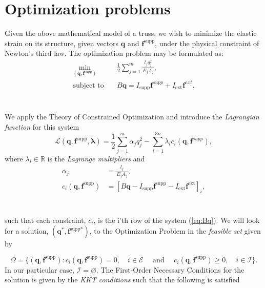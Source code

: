 \documentclass[10pt,a4paper]{article}
\begin{document}
\section{Optimization problems}
Given the above mathematical model of a truss, we wish to minimize the elastic strain on its structure, given vectors $\boldsymbol{q}$ and $\boldsymbol{f}^{\text{supp}}$, under the physical constraint of Newton's third law. The optimization problem may be formulated as:
\begin{align}
\min\limits_{(\boldsymbol{q},\boldsymbol{f}^{\text{supp}})}\quad&\frac{1}{2}\sum_{j=1}^m \frac{l_j q_j^2}{E_j A_j} ,\label{eq:min g}\\
\text{subject to} \quad &B\boldsymbol{q} = I_\text{supp}\boldsymbol{f}^{supp}+I_\text{ext}\boldsymbol{f}^{ext}.\label{eq:Bq}
\end{align}
\\\\
We apply the Theory of Constrained Optimization and introduce the \textit{Lagrangian function} for this system
\begin{equation*}
\mathcal{L}\left(\boldsymbol{q},\boldsymbol{f}^{\text{supp}},\boldsymbol{\lambda}\right) = \frac{1}{2}\sum_{j=1}^m \alpha_j q_{j}^2 - \sum_{i=1}^{3n}\lambda_i c_i\left(\boldsymbol{q},\boldsymbol{f}^{supp}\right),
\end{equation*}
where $\lambda_i \in \mathbb{R}$ is the \textit{Lagrange multipliers} and 
\begin{align*}
\alpha_j &= \frac{l_j}{E_j A_j}, \\
c_i\left(\boldsymbol{q},\boldsymbol{f}^\text{supp}\right) &= \left[ B\boldsymbol{q} - I_\text{supp}\boldsymbol{f}^\text{supp}-I_\text{ext}\boldsymbol{f}^\text{ext} \right]_i ,
\end{align*}
\\\\
such that each constraint, $c_i$, is the i'th row of the system (\ref{eq:Bq}). We will look for a solution, $\left(\boldsymbol{q}^*,\boldsymbol{f}^\text{supp*}\right)$, to the Optimization Problem in the \textit{feasible set} given by 

\begin{equation*}
\Omega = \lbrace \left(\boldsymbol{q},\boldsymbol{f}^\text{supp}\right) : c_i\left(\boldsymbol{q},\boldsymbol{f}^\text{supp}\right) = 0, \quad i \in \mathcal{E} \quad\text{ and }\quad c_i\left(\boldsymbol{q},\boldsymbol{f}^\text{supp}\right) \geq 0, \quad i \in \mathcal{I} \rbrace .
\end{equation*}
In our particular case, $\mathcal{I}=\varnothing$. The First-Order Necessary Conditions for the solution is given by the \textit{KKT conditions} such that the following is satisfied
\end{document}
